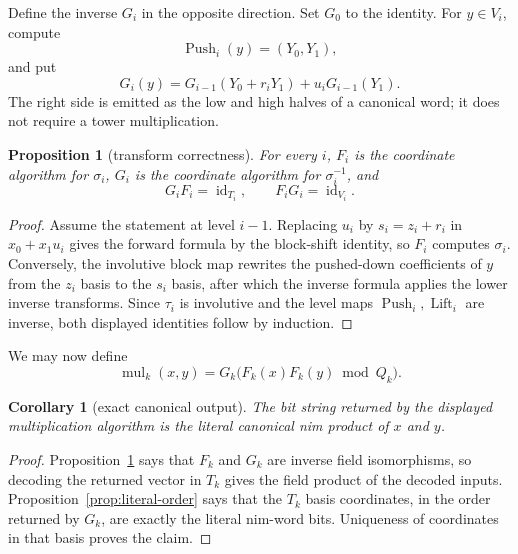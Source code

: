 \documentclass[11pt]{article}
\newtheorem{proposition}[theorem]{Proposition}
\newtheorem{corollary}[theorem]{Corollary}
\theoremstyle{definition}
\theoremstyle{remark}
\newcommand{\Push}{\operatorname{Push}}
\newcommand{\Lift}{\operatorname{Lift}}
\begin{document}
Define the inverse $G_i$ in the opposite direction.  Set $G_0$ to the
identity.  For $y\in V_i$, compute
\[
  \Push_i(y)=(Y_0,Y_1),
\]
and put
\begin{equation}
  G_i(y)=G_{i-1}(Y_0+r_iY_1)+u_iG_{i-1}(Y_1).
\end{equation}
The right side is emitted as the low and high halves of a canonical word; it
does not require a tower multiplication.

\begin{proposition}[transform correctness]\label{prop:transform-correct}
For every $i$, $F_i$ is the coordinate algorithm for $\sigma_i$, $G_i$ is
the coordinate algorithm for $\sigma_i^{-1}$, and
\[
  G_iF_i=\operatorname{id}_{T_i},
  \qquad
  F_iG_i=\operatorname{id}_{V_i}.
\]
\end{proposition}

\begin{proof}
Assume the statement at level $i-1$.  Replacing $u_i$ by
$s_i=z_i+r_i$ in $x_0+x_1u_i$ gives the forward formula by the block-shift
identity, so $F_i$ computes $\sigma_i$.  Conversely, the involutive block map
rewrites the pushed-down coefficients of $y$
from the $z_i$ basis to the $s_i$ basis, after which
the inverse formula applies the lower inverse transforms.  Since
$\tau_i$ is involutive and the level maps $\Push_i,\Lift_i$ are inverse,
both displayed identities follow by induction.
\end{proof}

We may now define
\begin{equation}
  \operatorname{mul}_k(x,y)
  =G_k\bigl(F_k(x)F_k(y)\bmod Q_k\bigr).
\end{equation}

\begin{corollary}[exact canonical output]\label{cor:exact-output}
The bit string returned by the displayed multiplication algorithm is the literal
canonical nim product of $x$ and $y$.
\end{corollary}

\begin{proof}
Proposition~\ref{prop:transform-correct} says that $F_k$ and $G_k$ are inverse
field isomorphisms, so decoding the returned vector in $T_k$ gives the field
product of the decoded inputs.  Proposition~\ref{prop:literal-order} says that
the $T_k$ basis coordinates, in the order returned by $G_k$, are exactly the
literal nim-word bits.  Uniqueness of coordinates in that basis proves the
claim.
\end{proof}
\end{document}
